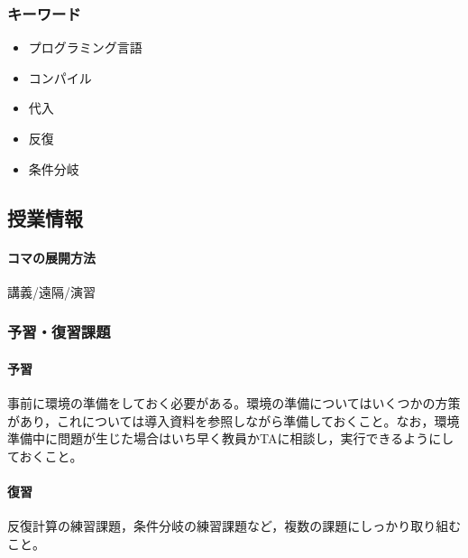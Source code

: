 \subsubsection{キーワード}
\begin{itemize}
	\item プログラミング言語
	\item コンパイル
	\item 代入
	\item 反復
	\item 条件分岐
\end{itemize}
\subsection{授業情報}
\paragraph{コマの展開方法}
講義/遠隔/演習
\subsubsection{予習・復習課題}
\paragraph{予習}事前に環境の準備をしておく必要がある。環境の準備についてはいくつかの方策があり，これについては導入資料を参照しながら準備しておくこと。なお，環境準備中に問題が生じた場合はいち早く教員かTAに相談し，実行できるようにしておくこと。
\paragraph{復習}反復計算の練習課題，条件分岐の練習課題など，複数の課題にしっかり取り組むこと。